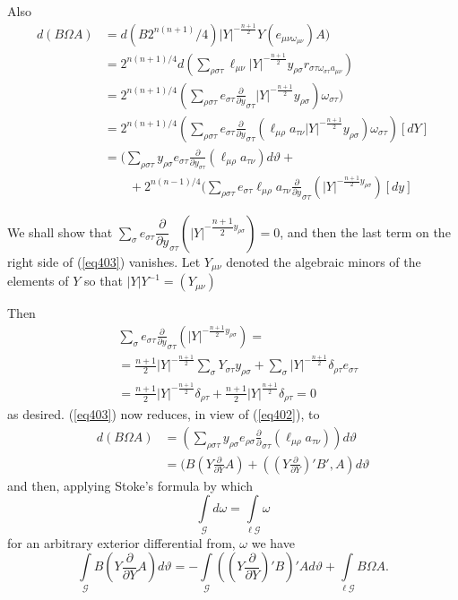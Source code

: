Also
\begin{align*}
d (B \Omega A) & = d (B 2 ^{n(n+1)}/4) |Y|^{- \frac{n+1}{2}} Y (e_{\mu
  \nu \omega_{\mu \nu}})A)\\ 
& = 2 ^{n (n+1)/4} d (\sum_{\rho \sigma \tau} \ell_{\mu \nu} |Y|
^{-\frac{n+1} {2}} y_{\rho \sigma} r_{\sigma \tau \omega_{\sigma \tau}
  a_{\mu \nu}})\\ 
& = 2^{n (n+1)/4} (\sum_{\rho \sigma \tau} e_{\sigma \tau }
\frac{\partial} {\partial y}_{\sigma \tau} |Y| ^{- \frac{n+1} {2}
}y_{\rho \sigma}) \omega_{\sigma \tau}) \\ 
&= 2^{n (n+1)/4} (\sum_{\rho \sigma \tau} e_{\sigma \tau }
\frac{\partial} {\partial y}_{\sigma \tau} ( \ell _{\mu \rho} a_{\tau
  \nu} |Y| ^{- \frac{n+1} {2} }y_{\rho \sigma}) \omega_{\sigma \tau})
     [dY] \\
& = (\sum_{\rho \sigma \tau} y_{\rho \sigma} e_{\sigma \tau}
     \frac{\partial}{\partial y _{\sigma \tau}} (\ell_{\mu \rho}
     a_{\tau \nu} )d \vartheta +  \\
& \qquad + 2^{n (n-1)/4} (\sum_{\rho \sigma\tau} e_{\sigma \tau} \ell_{\mu
       \rho} a_{\tau \nu} \frac{\partial}{\partial y}_{\sigma \tau} (
     |Y| ^{-\frac{n+1}{2}y_{\rho \sigma}}) [dy] \tag{403}\label{eq403} 
\end{align*}\pageoriginale

We shall show that $\sum_\sigma e_{\sigma \tau}
\dfrac{\partial}{\partial y}_{\sigma \tau} ( |Y|
^{-\dfrac{n+1}{2}y_{\rho \sigma}})=0$, and then the last term on the
right side of (\ref{eq403}) vanishes. Let $Y_{\mu \nu}$ denoted the
algebraic minors of the elements of $Y$ so that $|Y|Y^{-1} = (Y_{\mu
  \nu})$ 

Then
\begin{align*} 
& \sum_\sigma e_{\sigma \tau}  \frac{\partial}{\partial y}_{\sigma
    \tau}( |Y| ^{-\frac{n+1}{2}y_{\rho \sigma}}) = \\ 
& =\frac{n+1}{2} |Y|^{-\frac{n+1}{2}} \sum_\sigma Y _{\sigma \tau}
  y_{\rho \sigma} + \sum_\sigma |Y|^{-\frac{n+1}{2}} \delta _{\rho
    \tau} e_{\sigma \tau} \\ 
& = \frac{n+1}{2} |Y|^{-\frac{n+1}{2}} \delta_{\rho\tau} +
  \frac{n+1}{2} |Y| ^{\frac{n+1}{2}} \delta_{\rho\tau} = 0 
\end{align*}
as desired. (\ref{eq403}) now reduces, in view of (\ref{eq402}), to
\begin{align*}
d (B \Omega A) & = (\sum_{\rho \sigma \tau} y_{\rho \sigma} e_{\rho
  \sigma} \frac{\partial} {\partial}_{\sigma \tau} (\ell_{\mu \rho} a
_{\tau \nu})) d \vartheta \\ 
& =(B (Y \frac{\partial}{\partial Y} A) + (( Y
\frac{\partial}{\partial Y})' B',A) d \vartheta 
\end{align*}
and then, applying Stoke's formula by which 
$$
\int\limits_\mathcal{G} d \omega = \int\limits_{ \ell \mathcal{G}} \omega 
$$
for an arbitrary exterior differential from, $\omega$ we have 
$$
\int\limits_\mathcal{G} B (Y \frac{\partial} {\partial Y} A) d
\vartheta = -\int\limits_\mathcal{G}((Y \frac{\partial} {\partial
  Y})'B)'A d \vartheta + \int\limits_{\ell \mathcal{G}} B \Omega A. 
$$

